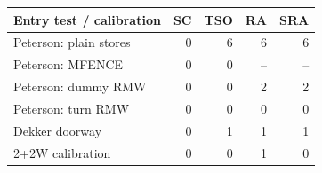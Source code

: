 \begin{tabular}{lrrrr}
\toprule Entry test / calibration & SC & TSO & RA & SRA \\
\midrule
Peterson: plain stores & 0 & 6 & 6 & 6 \\
Peterson: MFENCE & 0 & 0 & -- & -- \\
Peterson: dummy RMW & 0 & 0 & 2 & 2 \\
Peterson: turn RMW & 0 & 0 & 0 & 0 \\
Dekker doorway & 0 & 1 & 1 & 1 \\
2+2W calibration & 0 & 0 & 1 & 0 \\
\bottomrule
\end{tabular}
